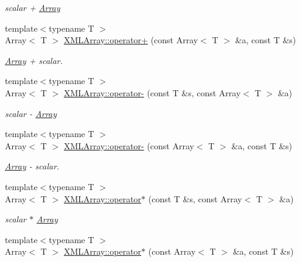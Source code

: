\begin{DoxyCompactItemize}
\begin{DoxyCompactList}\small\item\em scalar + \mbox{\hyperlink{classXMLArray_1_1Array}{Array}} \end{DoxyCompactList}\item 
{\footnotesize template$<$typename T $>$ }\\Array$<$ T $>$ \mbox{\hyperlink{namespaceXMLArray_a1276f5294299ad880d814c929988bf93}{X\+M\+L\+Array\+::operator+}} (const Array$<$ T $>$ \&a, const T \&s)
\begin{DoxyCompactList}\small\item\em \mbox{\hyperlink{classXMLArray_1_1Array}{Array}} + scalar. \end{DoxyCompactList}\item 
{\footnotesize template$<$typename T $>$ }\\Array$<$ T $>$ \mbox{\hyperlink{namespaceXMLArray_af485f313cac886a054ed3ca2f9507cab}{X\+M\+L\+Array\+::operator-\/}} (const T \&s, const Array$<$ T $>$ \&a)
\begin{DoxyCompactList}\small\item\em scalar -\/ \mbox{\hyperlink{classXMLArray_1_1Array}{Array}} \end{DoxyCompactList}\item 
{\footnotesize template$<$typename T $>$ }\\Array$<$ T $>$ \mbox{\hyperlink{namespaceXMLArray_acf50974b3d3fee37dd81c3ad47b2715d}{X\+M\+L\+Array\+::operator-\/}} (const Array$<$ T $>$ \&a, const T \&s)
\begin{DoxyCompactList}\small\item\em \mbox{\hyperlink{classXMLArray_1_1Array}{Array}} -\/ scalar. \end{DoxyCompactList}\item 
{\footnotesize template$<$typename T $>$ }\\Array$<$ T $>$ \mbox{\hyperlink{namespaceXMLArray_aaa1966396ac690ebef94472a82eb3aff}{X\+M\+L\+Array\+::operator$\ast$}} (const T \&s, const Array$<$ T $>$ \&a)
\begin{DoxyCompactList}\small\item\em scalar $\ast$ \mbox{\hyperlink{classXMLArray_1_1Array}{Array}} \end{DoxyCompactList}\item 
{\footnotesize template$<$typename T $>$ }\\Array$<$ T $>$ \mbox{\hyperlink{namespaceXMLArray_afa646c57d753c6caf977c840d370394e}{X\+M\+L\+Array\+::operator$\ast$}} (const Array$<$ T $>$ \&a, const T \&s)

\end{DoxyCompactItemize}

